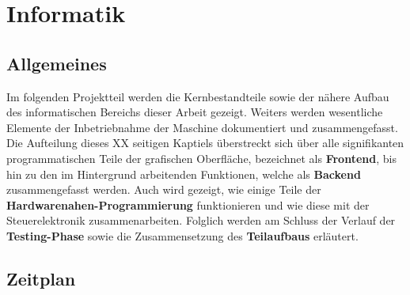 
\chapter{Informatik}\label{ch:informatik}
\section{Allgemeines}\label{subsec:einleitung}
Im folgenden Projektteil werden die Kernbestandteile sowie der nähere Aufbau des informatischen Bereichs dieser Arbeit gezeigt. Weiters werden wesentliche Elemente der Inbetriebnahme der Maschine dokumentiert und zusammengefasst. Die Aufteilung dieses XX seitigen Kaptiels überstreckt sich über alle signifikanten programmatischen Teile der grafischen Oberfläche, bezeichnet als \textbf{Frontend}, bis hin zu den im Hintergrund arbeitenden Funktionen, welche als \textbf{Backend} zusammengefasst werden.
Auch wird gezeigt, wie einige Teile der \textbf{Hardwarenahen-Programmierung} funktionieren und wie diese mit der Steuerelektronik zusammenarbeiten.
Folglich werden am Schluss der Verlauf der \textbf{Testing-Phase} sowie die Zusammensetzung des \textbf{Teilaufbaus} erläutert.

\section{Zeitplan}\label{subsec:zeitplan}

